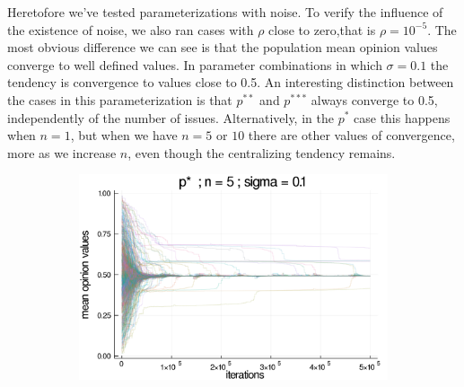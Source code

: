\documentclass{article}
\begin{document}
    Heretofore we've tested parameterizations with noise. To verify the
    influence of the existence of noise, we also ran cases with \(\rho\) close to
    zero,that is \(\rho = 10^{-5} \). The most obvious difference we can see is
    that the population mean opinion values converge to well defined values. In
    parameter combinations in which \(\sigma = 0.1\) the tendency is convergence
    to values close to 0.5. An interesting distinction between the cases in this
    parameterization is that \(p^{**}\) and \(p^{***}\) always converge to 0.5,
    independently of the number of issues. Alternatively, in the \(p^{*}\) case
    this happens when \(n=1\), but when we have \(n=5\) or \(10\) there are
    other values of convergence, more as we increase \(n\), even though the
    centralizing tendency remains.
    \begin{figure}[H]
      \centering
      \begin{subfigure}[b]{0.48\textwidth}
        \includegraphics[width=\textwidth]{img/series/tseries4/Poodlcalculatep*n5-rho10e-5-sigma01-00intransrandom.png}
      \end{subfigure}
      \begin{subfigure}[b]{0.48\textwidth}

\end{subfigure}
\end{figure}
\end{document}
